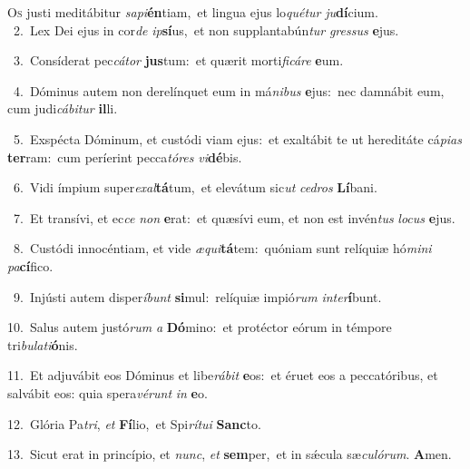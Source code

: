 \lettrine{\initial\textcolor{\initialcolor}{O}}{s} justi meditábitur \textit{sa}\-\textit{pi}\textbf{én}tiam,~\star et lingua ejus lo\-\textit{qué}\-\textit{tur} \textit{ju}\-\textbf{dí}cium.\\
{\numbfont\textcolor{\numbcolor}{~2.}}~Lex Dei ejus in cor\textit{de} \textit{ip}\-\textbf{sí}us,~\star et non supplantabún\textit{tur} \textit{gres}\-\textit{sus} \textbf{e}\-jus.\par
{\numbfont\textcolor{\numbcolor}{~3.}}~Consíderat pec\-\textit{cá}\-\textit{tor} \textbf{jus}\-tum:~\star et quærit morti\-\textit{fi}\-\textit{cá}\textit{re} \textbf{e}\-um.\par
{\numbfont\textcolor{\numbcolor}{~4.}}~Dóminus autem non derelínquet eum in má\-\textit{ni}\-\textit{bus} \textbf{e}\-jus:~\star nec damnábit eum, cum judi\-\textit{cá}\-\textit{bi}\textit{tur} \textbf{il}\-li.\par
{\numbfont\textcolor{\numbcolor}{~5.}}~Exspécta Dóminum, et custódi viam ejus:~\dagger et exaltábit te ut hereditáte cá\-\textit{pi}\-\textit{as} \textbf{ter}\-ram:~\star cum períerint pecca\-\textit{tó}\-\textit{res} \textit{vi}\-\textbf{dé}bis.\par
{\numbfont\textcolor{\numbcolor}{~6.}}~Vidi ímpium super\-\textit{ex}\-\textit{al}\textbf{tá}tum,~\star et elevátum sic\textit{ut} \textit{ce}\-\textit{dros} \textbf{Lí}\-bani.\par
{\numbfont\textcolor{\numbcolor}{~7.}}~Et transívi, et ec\textit{ce} \textit{non} \textbf{e}\-rat:~\star et quæsívi eum, et non est invén\textit{tus} \textit{lo}\-\textit{cus} \textbf{e}\-jus.\par
{\numbfont\textcolor{\numbcolor}{~8.}}~Custódi innocéntiam, et vide \textit{æ}\-\textit{qui}\textbf{tá}tem:~\star quóniam sunt relíquiæ hó\-\textit{mi}\-\textit{ni} \textit{pa}\-\textbf{cí}fico.\par
{\numbfont\textcolor{\numbcolor}{~9.}}~Injústi autem disper\-\textit{í}\-\textit{bunt} \textbf{si}\-mul:~\star relíquiæ impió\textit{rum} \textit{in}\-\textit{ter}\textbf{í}bunt.\par
{\numbfont\textcolor{\numbcolor}{10.}}~Salus autem justó\textit{rum} \textit{a} \textbf{Dó}\-mino:~\star et protéctor eórum in témpore tri\-\textit{bu}\-\textit{la}\textit{ti}\textbf{ó}nis.\par
{\numbfont\textcolor{\numbcolor}{11.}}~Et adjuvábit eos Dóminus et libe\-\textit{rá}\-\textit{bit} \textbf{e}\-os:~\star et éruet eos a peccatóribus, et salvábit eos: quia spera\-\textit{vé}\-\textit{runt} \textit{in} \textbf{e}\-o.\par
{\numbfont\textcolor{\numbcolor}{12.}}~Glória Pa\-\textit{tri}\-, \textit{et} \textbf{Fí}\-lio,~\star et Spi\-\textit{rí}\-\textit{tu}\textit{i} \textbf{Sanc}\-to.\par
{\numbfont\textcolor{\numbcolor}{13.}}~Sicut erat in princípio, et \textit{nunc}\-, \textit{et} \textbf{sem}\-per,~\star et in sǽcula sæ\-\textit{cu}\-\textit{ló}\textit{rum}. \textbf{A}\-men.\par
